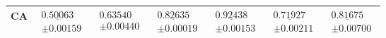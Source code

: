 \begin{table}[!htbp]
\begin{tabular*}{\textwidth}{@{\extracolsep{\fill}}lcccccc@{}}
        \addlinespace[3pt]
        CA & $\begin{gathered}\underline{0.50063}\\[-2pt]\pm 0.00159\end{gathered}$ & $\begin{gathered}0.63540\\[-2pt]\pm 0.00440\end{gathered}$ & $\begin{gathered}\underline{0.82635}\\[-2pt]\pm 0.00019\end{gathered}$ & $\begin{gathered}\underline{0.92438}\\[-2pt]\pm 0.00153\end{gathered}$ & $\begin{gathered}\underline{0.71927}\\[-2pt]\pm 0.00211\end{gathered}$ & $\begin{gathered}\underline{0.81675}\\[-2pt]\pm 0.00700\end{gathered}$ \\
        \bottomrule
    \end{tabular*}
\end{table}
